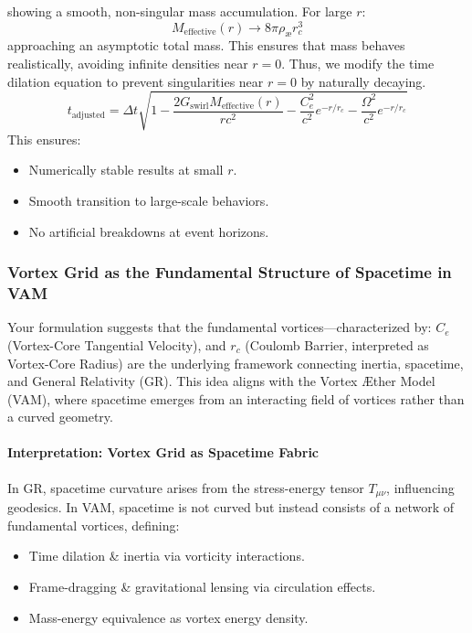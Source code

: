 showing a smooth, non-singular mass accumulation. For large $r$:
\begin{equation}
    M_{\text{effective}}(r) \to 8\pi \rho_{\text{\ae}} r_c^3
\end{equation}
approaching an asymptotic total mass. This ensures that mass behaves realistically, avoiding infinite densities near $r=0$. Thus, we modify the time dilation equation to prevent singularities near $r = 0$ by naturally decaying.
\begin{equation}
    \boxed{t_{\text{adjusted}} = \Delta t \sqrt{1 - \frac{2 G_{\text{swirl}} M_{\text{effective}}(r)}{r c^2} - \frac{C_e^2}{c^2} e^{-r/r_c} - \frac{\Omega^2}{c^2} e^{-r/r_c}}}
\end{equation}
This ensures:
\begin{itemize}
    \item Numerically stable results at small $r$.
    \item Smooth transition to large-scale behaviors.
    \item No artificial breakdowns at event horizons.
\end{itemize}


\subsubsection*{Vortex Grid as the Fundamental Structure of Spacetime in VAM}
Your formulation suggests that the fundamental vortices—characterized by:
$C_e$ (Vortex-Core Tangential Velocity), and
$r_c$ (Coulomb Barrier, interpreted as Vortex-Core Radius)
are the underlying framework connecting inertia, spacetime, and General Relativity (GR). This idea aligns with the Vortex \AE ther Model (VAM), where spacetime emerges from an interacting field of vortices rather than a curved geometry.

\paragraph{Interpretation: Vortex Grid as Spacetime Fabric}
In GR, spacetime curvature arises from the stress-energy tensor $T_{\mu\nu}$, influencing geodesics.
In VAM, spacetime is not curved but instead consists of a network of fundamental vortices, defining:
\begin{itemize}
    \item Time dilation \& inertia via vorticity interactions.
    \item Frame-dragging \& gravitational lensing via circulation effects.
    \item Mass-energy equivalence as vortex energy density.
\end{itemize}

